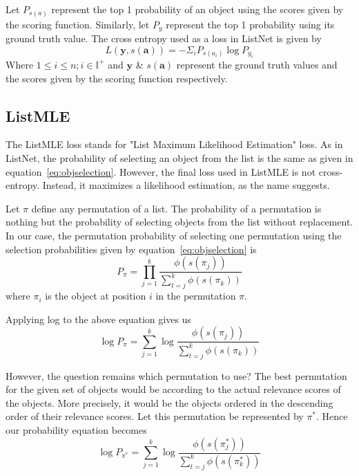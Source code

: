 \documentclass[12pt, twoside, ngerman]{report}
\begin{document}
Let $P_{s(a)}$ represent the top 1 probability of an object using the scores given by the scoring function.
Similarly,  let $P_y$ represent the top 1 probability using its ground truth value.
The cross entropy used as a loss in ListNet is given by
\begin{equation}
L(\textbf{y},  {s(\textbf{a})}) = - \Sigma_i P_{s(a_i)} \log P_{y_i}
\end{equation}
Where $1 \leq i \leq n; i \in \mathbb{I}^+$ and $\textbf{y}$ \& $s(\textbf{a})$ represent the ground truth values and the scores given by the scoring function respectively.

\subsection{ListMLE}\label{sec:listMLE}

The ListMLE loss stands for "List Maximum Likelihood Estimation" loss.
As in ListNet, the probability of selecting an object from the list is the same as given in equation~\ref{eq:objselection}.
However,  the final loss used in ListMLE is not cross-entropy.
Instead, it maximizes a likelihood estimation, as the name suggests.

Let $\pi$ define any permutation of a list.
The probability of a permutation is nothing but the probability of selecting objects from the list without replacement.
In our case, the permutation probability of selecting one permutation using the selection probabilities given by equation~\ref{eq:objselection}  is
\begin{equation}\label{eq:firstMLEequation}
P_{\pi} = \prod\limits_{j=1}^{k} \frac{\phi(s(\pi_j))}{ \sum\limits_{t=j}^k \phi(s(\pi_k))}
\end{equation}
where $\pi_i$ is the object at position $i$ in the permutation $\pi$.

Applying log to the above equation gives us
\begin{equation}
\log P_{\pi} = \sum\limits_{j=1}^{k} \log \frac{\phi(s(\pi_j))}{ \sum\limits_{t=j}^k \phi(s(\pi_k))}
\end{equation}

However, the question remains which permutation to use?
The best permutation for the given set of objects would be according to the actual relevance scores of the objects.
More precisely,  it would be the objects ordered in the descending order of their relevance scores.
Let this permutation be represented by $\pi^*$.
Hence our probability equation becomes
\begin{equation}
\log P_{\pi^*} = \sum\limits_{j=1}^{k} \log \frac{\phi(s(\pi^*_j))}{ \sum\limits_{t=j}^k \phi(s(\pi^*_k))}
\end{equation}
\end{document}
